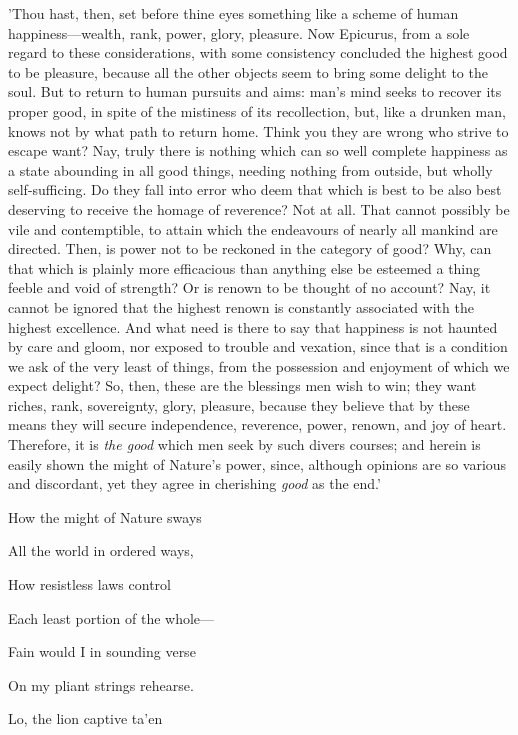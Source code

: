'Thou hast, then, set before thine eyes something like a scheme of human
happiness—wealth, rank, power, glory, pleasure. Now Epicurus, from a
sole regard to these considerations, with some consistency concluded the
highest good to be pleasure, because all the other objects seem to bring
some delight to the soul. But to return to human pursuits and aims:
man's mind seeks to recover its proper good, in spite of the mistiness
of its recollection, but, like a drunken man, knows not by what path to
return home. Think you they are wrong who strive to escape want? Nay,
truly there is nothing which can so well complete happiness as a state
abounding in all good things, needing nothing from outside, but wholly
self-sufficing. Do they fall into error who deem that which is best to
be also best deserving to receive the homage of reverence? Not at all.
That cannot possibly be vile and contemptible, to attain which the
endeavours of nearly all mankind are directed. Then, is power not to be
reckoned in the category of good? Why, can that which is plainly more
efficacious than anything else be esteemed a thing feeble and void of
strength? Or is renown to be thought of no account? Nay, it cannot be
ignored that the highest renown is constantly associated with the
highest excellence. And what need is there to say that happiness is not
haunted by care and gloom, nor exposed to trouble and vexation, since
that is a condition we ask of the very least of things, from the
possession and enjoyment of which we expect delight? So, then, these are
the blessings men wish to win; they want riches, rank, sovereignty,
glory, pleasure, because they believe that by these means they will
secure independence, reverence, power, renown, and joy of heart.
Therefore, it is \emph{the good} which men seek by such divers courses; and
herein is easily shown the might of Nature's power, since, although
opinions are so various and discordant, yet they agree in cherishing
\emph{good} as the end.'


How the might of Nature sways

All the world in ordered ways,

How resistless laws control

Each least portion of the whole—

Fain would I in sounding verse

On my pliant strings rehearse.

Lo, the lion captive ta'en

